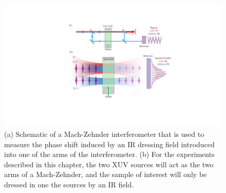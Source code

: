 \begin{figure}
	\centering
	\includegraphics[width=1.0\textwidth]{figures/CATS/CATS_mach_zehnder.pdf}
	\caption[Schematic of Mach-Zehnder interferometer and spatial profile with and without an IR dressing field in one arm of the interferometer]{(a) Schematic of a Mach-Zehnder interferometer that is used to measure the phase shift induced by an IR dressing field introduced into one of the arms of the interferometer. (b) For the experiments described in this chapter, the two XUV sources will act as the two arms of a Mach-Zehnder, and the sample of interest will only be dressed in one the sources by an IR field.}
	\label{fig:CATS_mach-zehnder_interferometer}
\end{figure}

